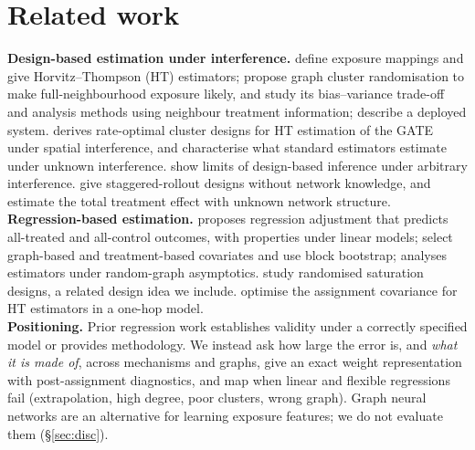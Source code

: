 \section{Related work}
\textbf{Design-based estimation under interference.} \citet{aronow2017} define exposure mappings and give Horvitz--Thompson (HT) estimators; \citet{ugander2013} propose graph cluster randomisation to make full-neighbourhood exposure likely, and \citet{eckles2017} study its bias--variance trade-off and analysis methods using neighbour treatment information; \citet{karrer2021} describe a deployed system. \citet{leung2022} derives rate-optimal cluster designs for HT estimation of the GATE under spatial interference, and \citet{savje2021} characterise what standard estimators estimate under unknown interference. \citet{basse2018} show limits of design-based inference under arbitrary interference. \citet{cortez2022} give staggered-rollout designs without network knowledge, and \citet{yu2022} estimate the total treatment effect with unknown network structure.\\
\textbf{Regression-based estimation.} \citet{chin2019} proposes regression adjustment that predicts all-treated and all-control outcomes, with properties under linear models; \citet{han2023} select graph-based and treatment-based covariates and use block bootstrap; \citet{liwager2022} analyses estimators under random-graph asymptotics. \citet{baird2018} study randomised saturation designs, a related design idea we include. \citet{covdesign2023} optimise the assignment covariance for HT estimators in a one-hop model.\\
\textbf{Positioning.} Prior regression work establishes validity under a correctly specified model or provides methodology. We instead ask how large the error is, and \emph{what it is made of}, across mechanisms and graphs, give an exact weight representation with post-assignment diagnostics, and map when linear and flexible regressions fail (extrapolation, high degree, poor clusters, wrong graph). Graph neural networks \citep{kipf2017,defferrard2016} are an alternative for learning exposure features; we do not evaluate them (\S\ref{sec:disc}).
